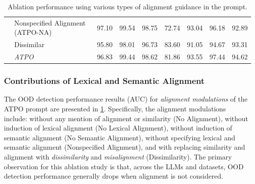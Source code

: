 \begin{table}[t!]
{\begin{tabular}{|l|l|ccccccc|}
                             &  Nonspecified Alignment (ATPO-NA)  &   97.10  &   99.54  &   98.75  &   72.74  &   93.04  &   96.18  &   \multicolumn{1}{|c|}{92.89}  \\
                             &  Dissimilar  &   95.80  &   98.01  &   96.73  &   83.60  &   91.05  &   94.67  &  \multicolumn{1}{|c|}{93.31}  \\  
                            &   \textit{ATPO}  &   96.83  &  99.44  &   98.62  &  81.86  &  93.55  &   97.44  &  \multicolumn{1}{|c|}{ 94.62}  \\  \hline
\end{tabular}
}
\caption{Ablation \syst performance using various types of alignment guidance in the prompt. %
}
\label{tab:atpo_results-align}
\end{table}

\subsubsection{Contributions of Lexical and Semantic Alignment}
The OOD detection performance results (AUC) for \textit{alignment modulations} of the ATPO prompt are presented in \ref{tab:atpo_results-align}. Specifically, the alignment modulations include: without any mention of alignment or similarity (No Alignment), without induction of lexical alignment (No Lexical Alignment), without induction of semantic alignment (No Semantic Alignment), without specifying lexical and semantic alignment (Nonspecified Alignment), and with replacing similarity and alignment with \textit{dissimilarity} and \textit{misalignment} (Dissimilarity). The primary observation for this ablation study is that, across the LLMs and datasets, OOD detection performance generally drops when alignment is not considered.

